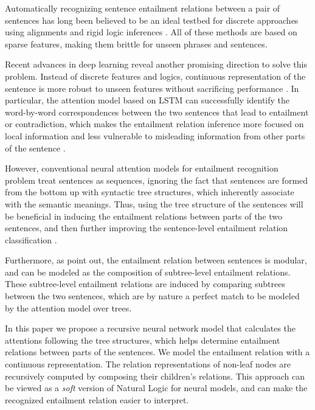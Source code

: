 
Automatically recognizing sentence entailment relations between 
a pair of sentences has long been believed to be an ideal testbed
for discrete approaches using alignments and 
rigid logic inferences
\cite{zanzotto2009machine,maccartney2009extended,wang2010probabilistic,watanabe2012latent,tian2014logical,filice2015structural}.
All of these methods are based on sparse features, 
making them brittle for unseen phrases and sentences.



Recent advances in deep learning reveal 
another promising direction to solve this problem. 
Instead of discrete features and logics, 
continuous representation of the sentence is more 
robust to unseen features  
without sacrificing performance \cite{bowman2015large}. 
In particular, the attention model based on 
LSTM can successfully
identify the word-by-word correspondences between the two sentences 
that lead to entailment or contradiction, 
which makes the entailment relation inference more focused on
local information and less vulnerable to misleading information
from other parts of the sentence \cite{rocktaschel2015reasoning,wang2015learning}. 

However, conventional neural attention models for 
entailment recognition problem treat sentences as sequences, 
ignoring the fact that sentences are formed 
from the bottom up with syntactic tree structures, 
which inherently associate with the semantic meanings. 
Thus, using the tree structure of the sentences will be beneficial 
in inducing the entailment relations between parts of the two sentences, 
and then further improving the sentence-level 
entailment relation classification \cite{watanabe2012latent}.

Furthermore, as  point
out, the entailment relation between sentences is modular,
and can be modeled as the composition of
subtree-level entailment relations.
These subtree-level entailment relations are induced
by comparing subtrees between the two sentences,
which are by nature a perfect match to be modeled
by the attention model over trees.


In this paper we propose a recursive neural network model 
that calculates the attentions following the tree structures, 
which helps determine entailment relations between parts of the sentences. 
We model the entailment relation 
with a continuous representation.%
The relation representations of non-leaf nodes
are recursively computed by composing their children's 
relations.
This approach can be viewed as a {\it soft} version of 
Natural Logic \cite{maccartney2009extended} 
for neural models, 
and can make the recognized entailment relation easier to interpret.

